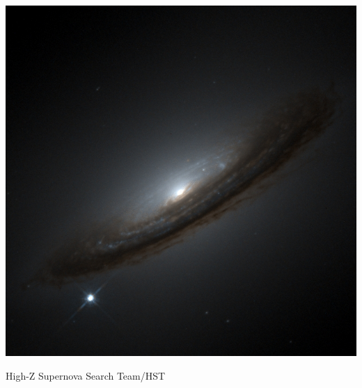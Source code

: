 \documentclass{beamer}
\begin{document}
\frame
{

    \begin{center}
        \includegraphics[height=0.9\textheight]{sn94d_hiz_big.jpg}
    \end{center}
    {\normalsize High-Z Supernova Search Team/HST }
}
\frame
\end{document}
